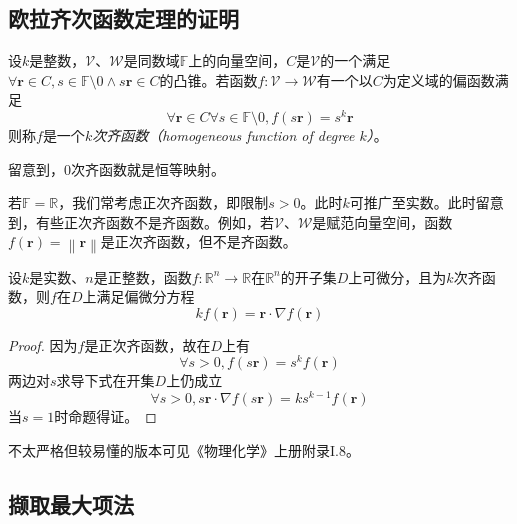\documentclass[main.tex]{subfiles}
\begin{document}
\subsection{欧拉齐次函数定理的证明}\label{sec:A.1_Euler_theorem_homogeneous_function}
\begin{definition}
    设$k$是整数，$\mathcal{V}$、$\mathcal{W}$是同数域$\mathbb{F}$上的向量空间，$C$是$\mathcal{V}$的一个满足$\forall\mathbf{r}\in C,s\in\mathbb{F}\setminus 0\wedge s\mathbf{r}\in C$的凸锥。若函数$f:\mathcal{V}\rightarrow\mathcal{W}$有一个以$C$为定义域的偏函数满足
    \[
        \forall \mathbf{r}\in C\forall s\in\mathbb{F}\setminus 0,f\left(s\mathbf{r}\right)=s^k\mathbf{r}
    \]
    则称$f$是一个\emph{$k$次齐函数（homogeneous function of degree $k$）}。
\end{definition}

留意到，0次齐函数就是恒等映射。

若$\mathbb{F}=\mathbb{R}$，我们常考虑正次齐函数，即限制$s>0$。此时$k$可推广至实数。此时留意到，有些正次齐函数不是齐函数。例如，若$\mathcal{V}$、$\mathcal{W}$是赋范向量空间，函数$f\left(\mathbf{r}\right)=\left\|\mathbf{r}\right\|$是正次齐函数，但不是齐函数。

\begin{theorem}[齐函数的欧拉定理]\label{thm:Euler_theorem_for_homogeneous_function}
    设$k$是实数、$n$是正整数，函数$f:\mathbb{R}^n\rightarrow\mathbb{R}$在$\mathbb{R}^n$的开子集$D$上可微分，且为$k$次齐函数，则$f$在$D$上满足偏微分方程
    \[kf\left(\mathbf{r}\right)=\mathbf{r}\cdot\nabla f\left(\mathbf{r}\right)\]
\end{theorem}
\begin{proof}
    因为$f$是正次齐函数，故在$D$上有
    \[\forall s>0,f\left(s\mathbf{r}\right)=s^kf\left(\mathbf{r}\right)\]
    两边对$s$求导下式在开集$D$上仍成立
    \[\forall s>0,s\mathbf{r}\cdot\nabla f\left(s\mathbf{r}\right)=ks^{k-1}f\left(\mathbf{r}\right)\]
    当$s=1$时命题得证。
\end{proof}

不太严格但较易懂的版本可见《物理化学》上册附录I.8。
\subsection{撷取最大项法}
\end{document}
